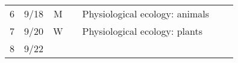 \documentclass[]{article}
\begin{document}
\begin{longtable}[]{@{}cccllll@{}}
\begin{minipage}[t]{0.12\columnwidth}
6\strut
\end{minipage} & \begin{minipage}[t]{0.08\columnwidth}\centering\strut
9/18\strut
\end{minipage} & \begin{minipage}[t]{0.07\columnwidth}\centering\strut
M\strut
\end{minipage} & \begin{minipage}[t]{0.10\columnwidth}\raggedright\strut
\strut
\end{minipage} & \begin{minipage}[t]{0.11\columnwidth}\raggedright\strut
Physiological ecology: animals\strut
\end{minipage} & \begin{minipage}[t]{0.11\columnwidth}\raggedright\strut
\strut
\end{minipage} & \begin{minipage}[t]{0.16\columnwidth}\raggedright\strut
\strut
\end{minipage}\tabularnewline
\begin{minipage}[t]{0.12\columnwidth}\centering\strut
7\strut
\end{minipage} & \begin{minipage}[t]{0.08\columnwidth}\centering\strut
9/20\strut
\end{minipage} & \begin{minipage}[t]{0.07\columnwidth}\centering\strut
W\strut
\end{minipage} & \begin{minipage}[t]{0.10\columnwidth}\raggedright\strut
\strut
\end{minipage} & \begin{minipage}[t]{0.11\columnwidth}\raggedright\strut
Physiological ecology: plants\strut
\end{minipage} & \begin{minipage}[t]{0.11\columnwidth}\raggedright\strut
\strut
\end{minipage} & \begin{minipage}[t]{0.16\columnwidth}\raggedright\strut
\strut
\end{minipage}\tabularnewline
\begin{minipage}[t]{0.12\columnwidth}\centering\strut
8\strut
\end{minipage} & \begin{minipage}[t]{0.08\columnwidth}\centering\strut
9/22\strut
\end{minipage} & \begin{minipage}[t]{0.07\columnwidth}\centering\strut

\end{minipage}
\end{longtable}
\end{document}
